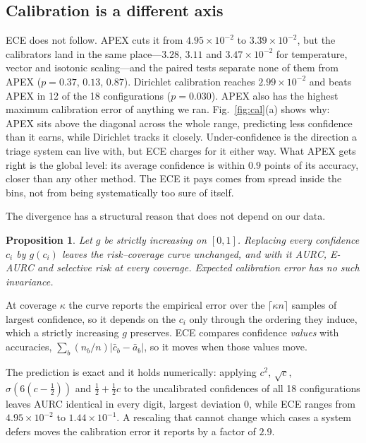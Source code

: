 \documentclass[conference]{IEEEtran}
\newtheorem{proposition}{Proposition}
\begin{document}
\subsection{Calibration is a different axis}
ECE does not follow. APEX cuts it from $4.95\times10^{-2}$ to
$3.39\times10^{-2}$, but the calibrators land in the same place---$3.28$, $3.11$
and $3.47\times10^{-2}$ for temperature, vector and isotonic scaling---and the
paired tests separate none of them from APEX ($p = 0.37$, $0.13$, $0.87$).
Dirichlet calibration reaches $2.99\times10^{-2}$ and beats APEX in 12 of the 18
configurations ($p = 0.030$). APEX also has the highest maximum calibration error
of anything we ran. Fig.~\ref{fig:cal}(a) shows why: APEX sits above the diagonal
across the whole range, predicting less confidence than it earns, while Dirichlet
tracks it closely. Under-confidence is the direction a triage system can live with, but ECE charges
for it either way.
What APEX gets right is the global level: its average confidence is within $0.9$
points of its accuracy, closer than any other method. The ECE it pays comes from
spread inside the bins, not from being systematically too sure of itself.

The divergence has a structural reason that does not depend on our data.

\begin{proposition}
\label{prop:inv}
Let $g$ be strictly increasing on $[0,1]$. Replacing every confidence $c_i$ by
$g(c_i)$ leaves the risk--coverage curve unchanged, and with it AURC, E-AURC and
selective risk at every coverage. Expected calibration error has no such
invariance.
\end{proposition}

\begin{IEEEproof}
At coverage $\kappa$ the curve reports the empirical error over the
$\lceil \kappa n\rceil$ samples of largest confidence, so it depends on the
$c_i$ only through the ordering they induce, which a strictly increasing $g$
preserves. ECE compares confidence \emph{values} with accuracies,
$\sum_b (n_b/n)|\bar c_b - \bar a_b|$, so it moves when those values move.
\end{IEEEproof}

The prediction is exact and it holds numerically: applying $c^2$, $\sqrt{c}$,
$\sigma(6(c-\tfrac12))$ and $\tfrac12+\tfrac12c$ to the uncalibrated confidences
of all 18 configurations leaves AURC identical in every digit, largest deviation
$0$, while ECE ranges from $4.95\times10^{-2}$ to $1.44\times10^{-1}$. A
rescaling that cannot change which cases a system defers moves the calibration
error it reports by a factor of $2.9$.
\end{document}
